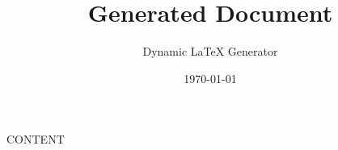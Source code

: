 \documentclass{article}
\title{Generated Document}
\author{Dynamic LaTeX Generator}
\date{\today}
\begin{document}
\maketitle

{{CONTENT}}
\end{document}
